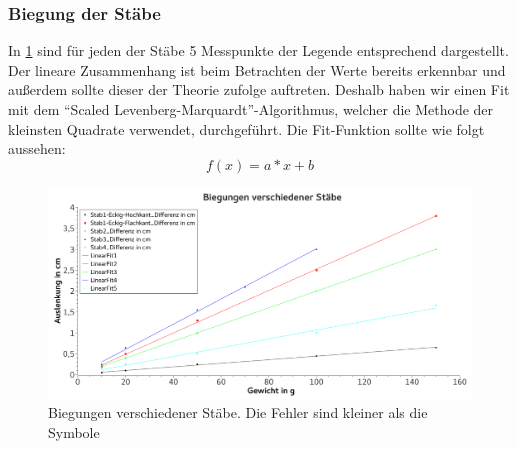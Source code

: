 \documentclass[
	a4paper,
	12pt,
	pagesize,
	ngerman
]{scrartcl}
\begin{document}
	\subsubsection{Biegung der Stäbe}
	In \cref{BiegungGraph} sind für jeden der Stäbe 5 Messpunkte der Legende entsprechend dargestellt. Der lineare Zusammenhang ist beim Betrachten der Werte bereits erkennbar und außerdem sollte dieser der Theorie zufolge auftreten. Deshalb haben wir einen Fit mit dem \enquote{Scaled Levenberg-Marquardt}-Algorithmus, welcher die Methode der kleinsten Quadrate verwendet, durchgeführt. Die Fit-Funktion sollte wie folgt aussehen:
	\begin{equation}
		f(x)=a*x+b
	\end{equation}
	\begin{figure}[tb]
		\includegraphics[width=1\textwidth]{Biegungen}
		\centering
		\caption{Biegungen verschiedener Stäbe. Die Fehler sind kleiner als die Symbole}
		\label{BiegungGraph}
		\centering
	\end{figure}
\end{document}
